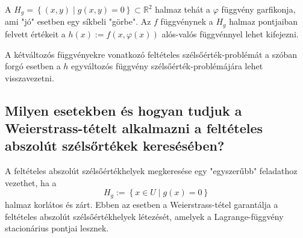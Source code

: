 \documentclass[12pt,a4paper]{article}
\newcommand{\R}{\mathbb{R}}
\newcommand{\f}{\varphi}
\newcommand{\braces}[1]{\left\lbrace #1 \right\rbrace}
\begin{document}
A $H_g = \braces{(x,y) \mid g(x,y) = 0} \subset \R^2$ halmaz tehát a $\f$ függvény garfikonja, ami "jó" esetben egy síkbeli "görbe". Az $f$ függvénynek a $H_g$ halmaz pontjaiban felvett értékeit a $h(x) := f(x,\f(x))$ alós-valós függvénnyel lehet kifejezni.

A kétváltozós függvényekre vonatkozó feltételes szélsőérték-problémát a szóban forgó esetben a $h$ egyváltozós függvény szélsőérték-problémájára lehet visszavezetni.
\subsection{Milyen esetekben és hogyan tudjuk a Weierstrass-tételt alkalmazni a feltételes abszolút szélsőrtékek keresésében?}
A feltételes abszolút szélsőértékhelyek megkeresése
egy "egyszerűbb" feladathoz vezethet, ha a
\[
H_g := \braces{x\in U \mid g(x) = 0}
\]
halmaz korlátos és zárt. Ebben az esetben a Weierstrass-tétel
garantálja a feltételes abszolút szélsőértékhelyek létezését, amelyek a Lagrange-függvény stacionárius pontjai lesznek.
\end{document}
